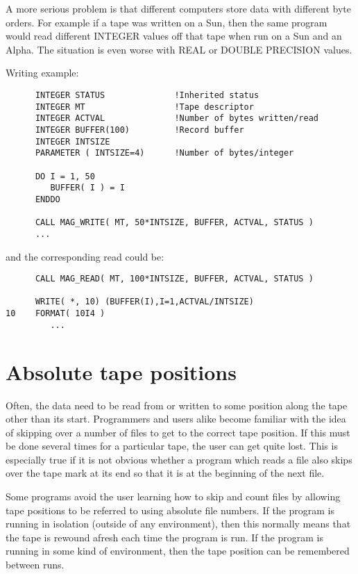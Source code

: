 A more serious problem is that different computers store data with
different byte orders. For example if a tape was written on a Sun, then the
same program would read different INTEGER values off that tape when run on a
Sun and an Alpha. The situation is even worse with REAL or DOUBLE PRECISION
values.

Writing example:
\small
\begin{verbatim}
      INTEGER STATUS              !Inherited status
      INTEGER MT                  !Tape descriptor
      INTEGER ACTVAL              !Number of bytes written/read
      INTEGER BUFFER(100)         !Record buffer
      INTEGER INTSIZE
      PARAMETER ( INTSIZE=4)      !Number of bytes/integer

      DO I = 1, 50
         BUFFER( I ) = I
      ENDDO

      CALL MAG_WRITE( MT, 50*INTSIZE, BUFFER, ACTVAL, STATUS )
      ...
\end{verbatim}
\normalsize
and the corresponding read could be:
\small
\begin{verbatim}
      CALL MAG_READ( MT, 100*INTSIZE, BUFFER, ACTVAL, STATUS )

      WRITE( *, 10) (BUFFER(I),I=1,ACTVAL/INTSIZE)
10    FORMAT( 10I4 )
         ...
\end{verbatim}
\normalsize

\section{\label{positions}Absolute tape positions}
Often, the data need to be read from or written to some position along
the tape other than its start. Programmers and users alike become
familiar with the idea of skipping over a number of files to get to
the correct tape position. If this must be done several times for a
particular tape, the user can get quite lost. This is especially true
if it is not obvious whether a program which reads a file also skips
over the tape mark at its end so that it is at the beginning of the next
file. 

Some programs avoid the user learning how to skip and count files by
allowing tape positions to be referred to using absolute file numbers.
If the program is running in isolation (outside of any environment),
then this normally means that the tape is rewound afresh each time the
program is run. If the program is running in some kind of environment,
then the tape position can be remembered between runs. 

